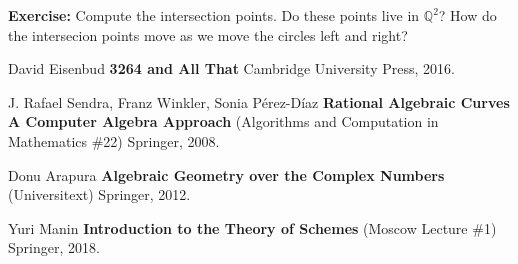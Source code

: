 \documentclass[12pt]{article}
\begin{document}
\textbf{Exercise:} Compute the intersection points.  Do these points live in $\mathbb{Q}^2$? How do the intersecion points move as we move the circles left and right?

\vfill

\begin{thebibliography}{} 

\item David Eisenbud \textbf{3264 and All That} Cambridge University Press, 2016.
\item J. Rafael Sendra, Franz Winkler, Sonia Pérez-Díaz \textbf{Rational Algebraic Curves
A Computer Algebra Approach} (Algorithms and Computation in Mathematics \#22) Springer, 2008.
\item Donu Arapura \textbf{Algebraic Geometry over the Complex Numbers} (Universitext) Springer, 2012.

\item Yuri Manin \textbf{Introduction to the Theory of Schemes} (Moscow Lecture \#1) Springer, 2018.

\end{thebibliography}

\newpage
\end{document}
